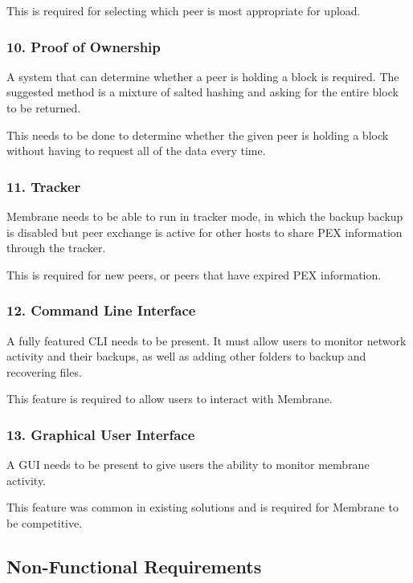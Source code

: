 \documentclass[11pt, a4paper, twocolumn, twoside]{report}
\begin{document}
This is required for selecting which peer is most appropriate for upload.

\subsubsection{10. Proof of Ownership}

A system that can determine whether a peer is holding a block is required. The suggested method is a mixture of salted hashing and asking for the entire block to be returned. 

This needs to be done to determine whether the given peer is holding a block without having to request all of the data every time.

\subsubsection{11. Tracker}

Membrane needs to be able to run in tracker mode, in which the backup backup is disabled but peer exchange is active for other hosts to share PEX information through the tracker.

This is required for new peers, or peers that have expired PEX information.

\subsubsection{12. Command Line Interface}

A fully featured CLI needs to be present. It must allow users to monitor network activity and their backups, as well as adding other folders to backup and recovering files.

This feature is required to allow users to interact with Membrane.

\subsubsection{13. Graphical User Interface}

A GUI needs to be present to give users the ability to monitor membrane activity.

This feature was common in existing solutions and is required for Membrane to be competitive.

\subsection{Non-Functional Requirements}
\end{document}
